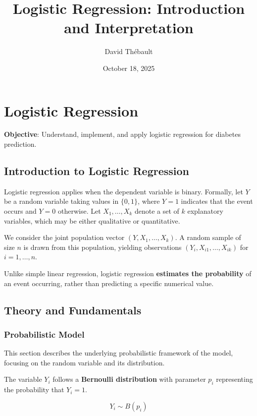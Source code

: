 \documentclass{article}
\title{Logistic Regression: Introduction and Interpretation}
\author{David Thébault}
\date{October 18, 2025}
\begin{document}
\maketitle %

\section{\texorpdfstring{\textbf{Logistic
Regression}}{Logistic Regression}}\label{logistic-regression}

\textbf{Objective}: Understand, implement, and apply logistic regression
for diabetes prediction.


\subsection{Introduction to Logistic Regression}

Logistic regression applies when the dependent variable is binary.
Formally, let \(Y\) be a random variable taking values in \(\{0,1\}\),
where \(Y=1\) indicates that the event occurs and \(Y=0\) otherwise.
Let \(X_1,\ldots,X_k\) denote a set of \(k\) explanatory variables,
which may be either qualitative or quantitative.

We consider the joint population vector \((Y, X_1,\ldots,X_k)\).
A random sample of size \(n\) is drawn from this population,
yielding observations \((Y_i, X_{i1},\ldots,X_{ik})\) for
\(i = 1,\ldots,n\).

Unlike simple linear regression, logistic regression 
\textbf{estimates the probability} of an event occurring, rather than predicting a
specific numerical value.

\subsection{Theory and Fundamentals}

\subsubsection{Probabilistic Model}

This section describes the underlying probabilistic framework of the
model, focusing on the random variable and its distribution.

The variable \(Y_i\) follows a \textbf{Bernoulli distribution} with
parameter \(p_i\) representing the probability that \(Y_i=1\).

\[Y_i \sim B(p_i)\]
\end{document}
